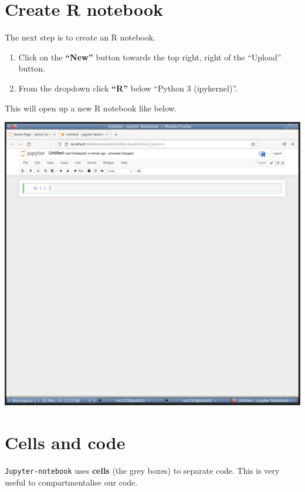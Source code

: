 \documentclass[
]{book}
\providecommand{\tightlist}{%
  \setlength{\itemsep}{0pt}\setlength{\parskip}{0pt}}
\begin{document}
\hypertarget{create-r-notebook}{%
\section{Create R notebook}\label{create-r-notebook}}

The next step is to create an R notebook.

\begin{enumerate}
\def\labelenumi{\arabic{enumi}.}
\tightlist
\item
  Click on the \textbf{``New''} button towards the top right, right of the ``Upload'' button.
\item
  From the dropdown click \textbf{``R''} below ``Python 3 (ipykernel)''.
\end{enumerate}

This will open up a new R notebook like below.

\includegraphics{figures/jupyter_notebook_example_2.png}

\hypertarget{cells-and-code}{%
\section{Cells and code}\label{cells-and-code}}

\texttt{Jupyter-notebook} uses \textbf{cells} (the grey boxes) to separate code. This is very useful to compartmentalise our code.
\end{document}
